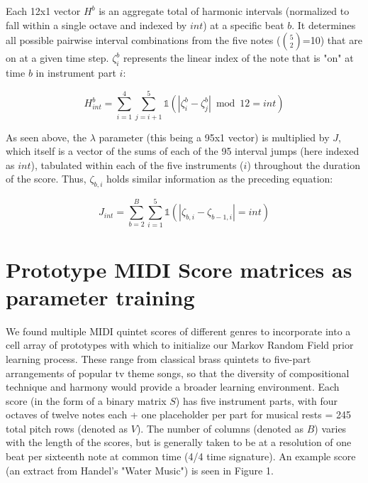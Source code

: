 \documentclass{article}
\begin{document}
Each 12x1 vector $H^b$ is an aggregate total of harmonic intervals (normalized to fall within a single octave and indexed by $int$) at a specific beat $b$.  It determines all possible pairwise interval combinations from the five notes (${5\choose2}$=10) that are on at a given time step.  $\zeta_i^b$ represents the linear index of the note that is "on" at time $b$ in instrument part $i$:

\[H_{int}^b = \sum_{i=1}^4\sum_{j=i+1}^5\mathbb{1}\left(\left|\zeta_i^b-\zeta_j^b\right|\bmod{12} = int\right)\]

As seen above, the $\lambda$ parameter (this being a 95x1 vector) is multiplied by $J$, which itself is a vector of the sums of each of the 95 interval jumps (here indexed as $int$), tabulated within each of the five instruments ($i$) throughout the duration of the score.  Thus, $\zeta_{b,i}$ holds similar information as the preceding equation:

\[J_{int} = \sum_{b=2}^{B}\sum_{i=1}^5\mathbb{1}\left(\left|\zeta_{b,i}-\zeta_{b-1,i}\right| = int\right)\]

\section{Prototype MIDI Score matrices as parameter training}

We found multiple MIDI quintet scores of different genres to incorporate into a cell array of prototypes with which to initialize our Markov Random Field prior learning process.  These range from classical brass quintets to five-part arrangements of popular tv theme songs, so that the diversity of compositional technique and harmony would provide a broader learning environment.  Each score (in the form of a binary matrix $S$) has five instrument parts, with four octaves of twelve notes each + one placeholder per part for musical rests = 245 total pitch rows (denoted as $V$).  The number of columns (denoted as $B$) varies with the length of the scores, but is generally taken to be at a resolution of one beat per sixteenth note at common time (4/4 time signature).  An example score (an extract from Handel's "Water Music") is seen in Figure 1.
\end{document}
